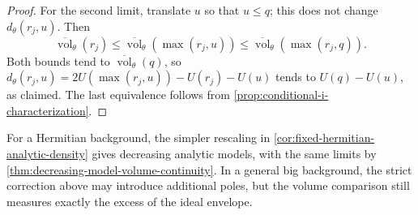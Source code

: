 \begin{proof}
For the second limit, translate $u$ so that $u\leq q$; this does not change $d_\theta(r_j,u)$. Then
\[
 \overline{\operatorname{vol}}_\theta(r_j)
 \leq\overline{\operatorname{vol}}_\theta(\max(r_j,u))
 \leq\overline{\operatorname{vol}}_\theta(\max(r_j,q)).
\]
Both bounds tend to $\overline{\operatorname{vol}}_\theta(q)$, so $d_\theta(r_j,u)=2U(\max(r_j,u))-U(r_j)-U(u)$ tends to $U(q)-U(u)$, as claimed. The last equivalence follows from \cref{prop:conditional-i-characterization}.
\end{proof}

For a Hermitian background, the simpler rescaling in \cref{cor:fixed-hermitian-analytic-density} gives decreasing analytic models, with the same limits by \cref{thm:decreasing-model-volume-continuity}. In a general big background, the strict correction above may introduce additional poles, but the volume comparison still measures exactly the excess of the ideal envelope.

